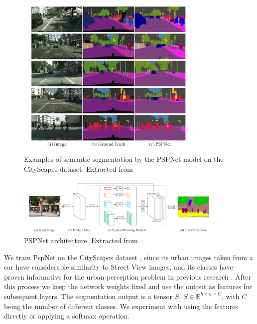 \begin{figure}[ht]
	\begin{center}
	\includegraphics[width=0.8\textwidth]{./figures/segmentation.png}
	\caption[Example of Semantic Segmentation]{Examples of semantic segmentation by the PSPNet model on the CityScapes dataset. Extracted from  }
	\label{fig:segmentation}
	\end{center}
\end{figure}

\begin{figure}[ht]
	\begin{center}
	\includegraphics[width=0.9\textwidth]{./figures/pspnet.png}
	\caption[PspNet architecture]{PSPNet architecture. Extracted from  }
	\label{fig:segmentation}
	\end{center}
\end{figure}

We train PspNet on the CityScapes dataset \cite{cordts_cityscapes}, since its urban images taken from a car have
considerable similarity to Street View images, and its classes have proven informative for the urban perception problem
in previous research \cite{rossetti,zhang_measuring}. After this process we keep the network weights fixed
and use the output as features for subsequent layers. The segmentation output  is a tensor $S$, $S \in \mathbb{R}^{h\times w \times C}$, with $C$
being the number of different classes. We experiment with using the features directly or applying a softmax operation.

